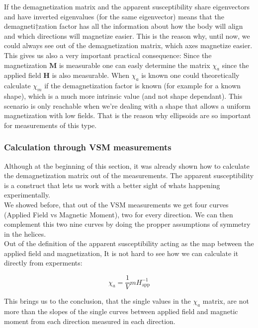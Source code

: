 If the demagnetization matrix and the apparent susceptibility share eigenvectors and have inverted eigenvalues (for the same eigenvector) means that the demagneti†zation factor has all the information about how the body will align and which directions will magnetize easier. This is the reason why, until now, we could always see out of the demagnetization matrix, which axes magnetize easier.\\

This gives us also a very important practical consequence: Since the magnetization $\textbf{M}$ is measurable one can easly determine the matrix $\chi_a$ since the applied field $\textbf{H}$ is also measurable. When $\chi_a$ is known one could theoretically calculate $\chi_m$ if the demagnetization factor is known (for example for a known shape), which is a much more intrinsic value (and not shape dependant). This scenario is only reachable when we're dealing with a shape that allows a uniform magnetization with low fields. That is the reason why ellipsoids are so important for measurements of this type.

\subsubsection{Calculation through VSM measurements}

Although at the beginning of this section, it was already shown how to calculate the demagnetization matrix out of the measurements. The apparent susceptibility is a construct that lets us work with a better sight of whats happening experimentally.\\

We showed before, that out of the VSM measurements we get four curves (Applied Field vs Magnetic Moment), two for every direction. We can then complement this two nine curves by doing the propper assumptions of symmetry in the helices.\\

Out of the definition of the apparent susceptibility acting as the map between the applied field and magnetization, It is not hard to see how we can calculate it directly from experments:

\begin{equation}
\chi_a = \frac{1}{V}mH_\text{app}^{-1}
\end{equation}

This brings us to the conclusion, that the single values in the $\chi_a$ matrix, are not more than the slopes of the single curves between applied field and magnetic moment from each direction measured in each direction.

